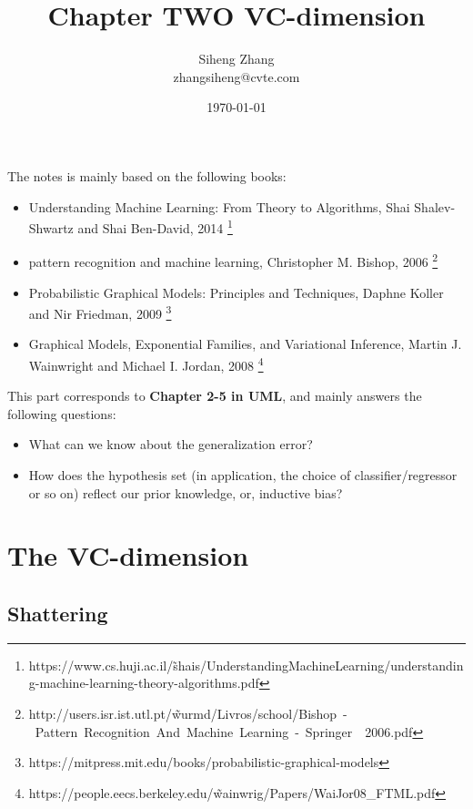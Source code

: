 \documentclass{article}
\author{Siheng Zhang\\zhangsiheng@cvte.com}
\title{Chapter TWO VC-dimension}
\date{\today}
\begin{document}
\maketitle  

The notes is mainly based on the following books:

\begin{itemize}
\item Understanding Machine Learning: From Theory to Algorithms, Shai Shalev-Shwartz and Shai Ben-David, 2014 \footnote{https://www.cs.huji.ac.il/\~shais/UnderstandingMachineLearning/understanding-machine-learning-theory-algorithms.pdf}

\item pattern recognition and machine learning, Christopher M. Bishop, 2006 \footnote{http://users.isr.ist.utl.pt/\~wurmd/Livros/school/Bishop\ -\ Pattern\ Recognition\ And\ Machine\ Learning\ -\ Springer\ \ 2006.pdf}

\item Probabilistic Graphical Models: Principles and Techniques, Daphne Koller and Nir Friedman, 2009 \footnote{https://mitpress.mit.edu/books/probabilistic-graphical-models}

\item Graphical Models, Exponential Families, and Variational Inference, Martin J. Wainwright and Michael I. Jordan, 2008 \footnote{https://people.eecs.berkeley.edu/\~wainwrig/Papers/WaiJor08\_FTML.pdf}
\end{itemize}

This part corresponds to \textbf{Chapter 2-5 in UML}, and mainly answers the following questions:

\begin{itemize}
\item What can we know about the generalization error?
\item How does the hypothesis set (in application, the choice of classifier/regressor or so on) reflect our prior knowledge, or, inductive bias?
\end{itemize}

\newpage

\tableofcontents
\newpage

\section{The VC-dimension}

\subsection{Shattering}
\end{document}
